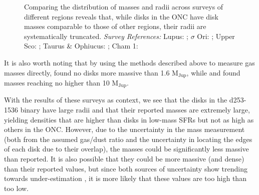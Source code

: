 


\begin{figure}[h!]
  \centering
    \hspace*{\fill}%
    \hspace*{\fill}%
    \caption{Comparing the distribution of masses and radii across surveys of different regions \citep{Eisner2018} reveals that, while disks in the ONC have disk masses comparable to those of other regions, their radii are systematically truncated. \textit{Survey References:} Lupus: \citet{Tazzari2017}; $\sigma$ Ori: \citet{Ansdell2017}; Upper Sco: \citet{Barenfeld2017}; Taurus \& Ophiucus: \citet{Tripathi2017}; Cham 1: \citet{Pascucci2016}}
    \label{fig:eisner18_disk_properties}
\end{figure}


It is also worth noting that by using the methods described above to measure gas masses directly, \citet{Miotello2017} found no disks more massive than 1.6 M$_\text{Jup}$, while \citet{Ansdell2016} and \citet{Ansdell2018} found masses reaching no higher than 10 M$_\text{Jup}$.


With the results of these surveys as context, we see that the disks in the d253-1536 binary have large radii and that their reported masses are extremely large, yielding densities that are higher than disks in low-mass SFRs but not as high as others in the ONC. However, due to the uncertainty in the mass measurement (both from the assumed gas/dust ratio and the uncertainty in locating the edges of each disk due to their overlap), the masses could be significantly less massive than reported. It is also possible that they could be more massive (and dense) than their reported values, but since both sources of uncertainty show trending towards under-estimation \citep[][showed that disks in Lupus were better represented by a 10:1 gas/dust ratio, and, as discussed in \S\ref{chap:results}, the integrated flux measurement that yields the disks' dust masses is likely over-counting emission]{Miotello2017}, it is more likely that these values are too high than too low.




